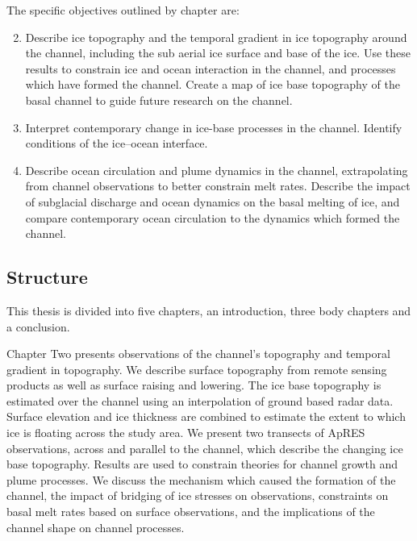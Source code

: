 The specific objectives outlined by chapter are:
\begin{enumerate}
    \setcounter{enumi}{1}
    \item Describe ice topography and the temporal gradient in ice topography around the channel, including the sub aerial ice surface and base of the ice. Use these results to constrain ice and ocean interaction in the channel, and processes which have formed the channel. Create a map of ice base topography of the basal channel to guide future research on the channel.
    \item Interpret contemporary change in ice-base processes in the channel. Identify conditions of the ice–ocean interface. 
    \item Describe ocean circulation and plume dynamics in the channel, extrapolating from channel observations to better constrain melt rates. Describe the impact of subglacial discharge and  ocean dynamics on the basal melting of ice, and compare contemporary ocean circulation to the dynamics which formed the channel. 
\end{enumerate}


\subsection{Structure} \label{sec:structure}


This thesis is divided into five chapters, an introduction, three body chapters and a conclusion. 
 
Chapter Two presents observations of the channel's topography and temporal gradient in topography. We describe surface topography  from remote sensing products as well as surface raising and lowering. The ice base topography is estimated over the channel using an interpolation of ground based radar data. Surface elevation and ice thickness are combined to estimate the extent to which ice is floating across the study area.  We present two transects of ApRES observations, across and parallel to the channel, which describe the changing ice base topography.   Results are used to constrain theories for channel growth and plume processes. We discuss the mechanism which caused the formation of the channel, the impact of bridging of ice stresses on observations, constraints on basal melt rates based on surface observations, and the implications of the channel shape on channel processes. 



